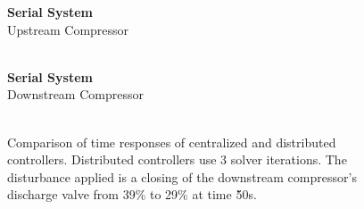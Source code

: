 \begin{figure}
  {\centering\small\textbf{Serial System}\\Upstream Compressor\\[0.5em]}
    \resizebox{0.48\linewidth}{!}{%
      
    }
  \hfill
    \resizebox{0.48\linewidth}{!}{%
      
    }
  \\
    \resizebox{0.48\linewidth}{!}{%
      
    }
  \hfill
    \resizebox{0.48\linewidth}{!}{%
      
    }

  {\centering\small\textbf{Serial System}\\Downstream Compressor\\[0.5em]}
    \resizebox{0.48\linewidth}{!}{%
      
    }
  \hfill
    \resizebox{0.48\linewidth}{!}{%
      
    }
  \\
    \resizebox{0.48\linewidth}{!}{%
      
    }
  \hfill
    \resizebox{0.48\linewidth}{!}{%
      
    }
  \caption[Time response of serial system.]{Comparison of time responses of centralized and distributed controllers. Distributed controllers use 3 solver iterations. The disturbance applied is a closing of the downstream compressor's discharge valve from 39\% to 29\% at time \u{50}{s}.}
  \label{fig:res:serial-timeresp}
\end{figure}


